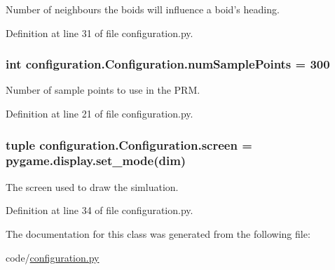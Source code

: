 Number of neighbours the boids will influence a boid's heading. 



Definition at line 31 of file configuration.\-py.

\hypertarget{classconfiguration_1_1Configuration_a35685f1f81ce810f4a429654c6b27334}{
\subsubsection[{num\-Sample\-Points}]{\setlength{\rightskip}{0pt plus 5cm}int configuration.\-Configuration.\-num\-Sample\-Points = 300\hspace{0.3cm}{\ttfamily [static]}}}\label{classconfiguration_1_1Configuration_a35685f1f81ce810f4a429654c6b27334}


Number of sample points to use in the P\-R\-M. 



Definition at line 21 of file configuration.\-py.

\hypertarget{classconfiguration_1_1Configuration_a04b8c98906296ee65625d1472e037a75}{
\subsubsection[{screen}]{\setlength{\rightskip}{0pt plus 5cm}tuple configuration.\-Configuration.\-screen = pygame.\-display.\-set\-\_\-mode({\bf dim})\hspace{0.3cm}{\ttfamily [static]}}}\label{classconfiguration_1_1Configuration_a04b8c98906296ee65625d1472e037a75}


The screen used to draw the simluation. 



Definition at line 34 of file configuration.\-py.



The documentation for this class was generated from the following file\-:\begin{DoxyCompactItemize}
\item 
code/\hyperlink{configuration_8py}{configuration.\-py}\end{DoxyCompactItemize}
